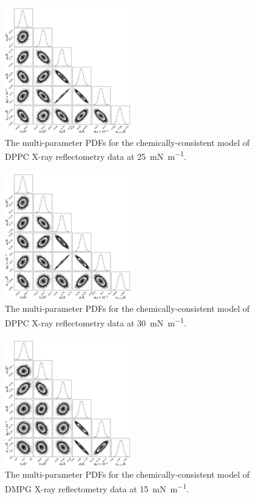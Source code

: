 \documentclass[amsmath,amssymb,superscriptaddress]{revtex4-1}
\begin{document}
\begin{figure}[H]
	\centering
	\includegraphics[width=0.50\textwidth]{figures/dppc3_all_corner}
	\caption{The multi-parameter PDFs for the chemically-consistent model of DPPC X-ray reflectometry data at \SI{25}{\milli\newton\per\meter}.}
	\label{fig:dppc3}
\end{figure}
\begin{figure}[H]
	\centering
	\includegraphics[width=0.50\textwidth]{figures/dppc4_all_corner}
	\caption{The multi-parameter PDFs for the chemically-consistent model of DPPC X-ray reflectometry data at \SI{30}{\milli\newton\per\meter}.}
	\label{fig:dppc4}
\end{figure}
\begin{figure}[H]
	\centering
	\includegraphics[width=0.50\textwidth]{figures/dmpg1_all_corner}
	\caption{The multi-parameter PDFs for the chemically-consistent model of DMPG X-ray reflectometry data at \SI{15}{\milli\newton\per\meter}.}
	\label{fig:dmpg1}
\end{figure}
\end{document}
